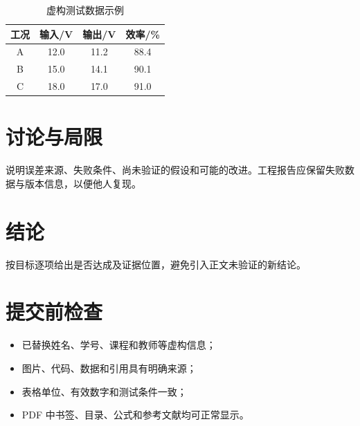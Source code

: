 \documentclass[12pt,fontset=fandol]{ctexart}
\begin{document}
\begin{table}[htbp]
  \centering
  \caption{虚构测试数据示例}\label{tab:results}
  \begin{tabular}{cccc}
    \toprule
    工况 & 输入/\unit{\volt} & 输出/\unit{\volt} & 效率/\unit{\percent} \\
    \midrule
    A & 12.0 & 11.2 & 88.4 \\
    B & 15.0 & 14.1 & 90.1 \\
    C & 18.0 & 17.0 & 91.0 \\
    \bottomrule
  \end{tabular}
\end{table}

\section{讨论与局限}
说明误差来源、失败条件、尚未验证的假设和可能的改进。工程报告应保留失败数据与版本信息，以便他人复现。

\section{结论}
按目标逐项给出是否达成及证据位置，避免引入正文未验证的新结论。

\printbibliography[heading=bibintoc]

\appendix
\section{提交前检查}
\begin{itemize}
  \item 已替换姓名、学号、课程和教师等虚构信息；
  \item 图片、代码、数据和引用具有明确来源；
  \item 表格单位、有效数字和测试条件一致；
  \item PDF 中书签、目录、公式和参考文献均可正常显示。
\end{itemize}
\end{document}

